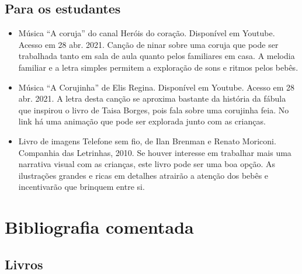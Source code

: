 \documentclass[11pt]{extarticle}
\begin{document}
\subsection{Para os estudantes}
\begin{itemize}
\item Música “A coruja” do canal Heróis do coração. Disponível em Youtube. Acesso em 28 abr. 2021. 
Canção de ninar sobre uma coruja que pode ser trabalhada tanto em sala de aula quanto pelos familiares em casa. 
A melodia familiar e a letra simples permitem a exploração de sons e ritmos pelos bebês. 

\item Música “A Corujinha” de Elis Regina. Disponível em Youtube. Acesso em 28 abr. 2021. 
A letra desta canção se aproxima bastante da história da fábula que inspirou o livro de Taisa Borges, 
pois fala sobre uma corujinha feia. No link há uma animação que pode ser explorada junto com as crianças. 

\item Livro de imagens Telefone sem fio, de Ilan Brenman e Renato Moriconi. Companhia das Letrinhas, 2010. 
Se houver interesse em trabalhar mais uma narrativa visual com as crianças, este livro pode ser uma boa opção. 
As ilustrações grandes e ricas em detalhes atrairão a atenção dos bebês e incentivarão que brinquem entre si. 
\end{itemize}


\section{Bibliografia comentada}

\subsection{Livros}
\end{document}
